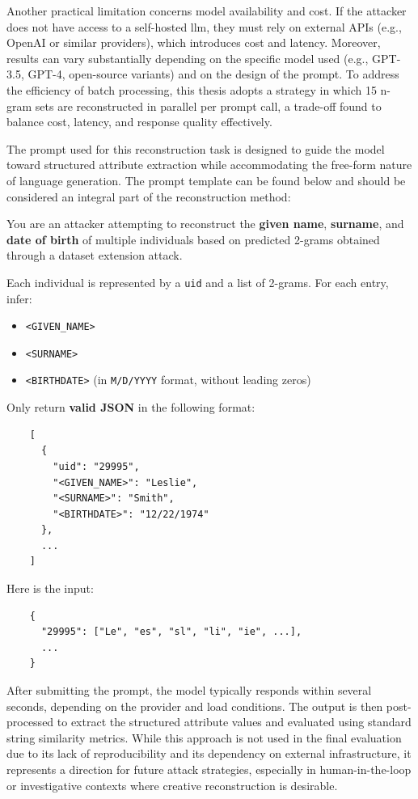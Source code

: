 Another practical limitation concerns model availability and cost.
If the attacker does not have access to a self-hosted \ac{llm}, they must rely on external APIs (e.g., OpenAI or similar providers), which introduces cost and latency.
Moreover, results can vary substantially depending on the specific model used (e.g., GPT-3.5, GPT-4, open-source variants) and on the design of the prompt.
To address the efficiency of batch processing, this thesis adopts a strategy in which 15 n-gram sets are reconstructed in parallel per prompt call, a trade-off found to balance cost, latency, and response quality effectively.

The prompt used for this reconstruction task is designed to guide the model toward structured attribute extraction while accommodating the free-form nature of language generation.
The prompt template can be found below and should be considered an integral part of the reconstruction method:

\begin{tcolorbox}[title=Prompt Template for \ac{llm} Based Reconstruction,colback=gray!5,colframe=black!50!black]
    You are an attacker attempting to reconstruct the \textbf{given name}, \textbf{surname}, and \textbf{date of birth} of multiple individuals based on predicted 2-grams obtained through a dataset extension attack.

    Each individual is represented by a \texttt{uid} and a list of 2-grams. For each entry, infer:
    \begin{itemize}
        \item \texttt{<GIVEN\_NAME>}
        \item \texttt{<SURNAME>}
        \item \texttt{<BIRTHDATE>} (in \texttt{M/D/YYYY} format, without leading zeros)
    \end{itemize}

    Only return \textbf{valid JSON} in the following format:
    \begin{verbatim}
    [
      {
        "uid": "29995",
        "<GIVEN_NAME>": "Leslie",
        "<SURNAME>": "Smith",
        "<BIRTHDATE>": "12/22/1974"
      },
      ...
    ]
    \end{verbatim}

    Here is the input:
    \begin{verbatim}
    {
      "29995": ["Le", "es", "sl", "li", "ie", ...],
      ...
    }
    \end{verbatim}
    \end{tcolorbox}


After submitting the prompt, the model typically responds within several seconds, depending on the provider and load conditions.
The output is then post-processed to extract the structured attribute values and evaluated using standard string similarity metrics.
While this approach is not used in the final evaluation due to its lack of reproducibility and its dependency on external infrastructure, it represents a direction for future attack strategies, especially in human-in-the-loop or investigative contexts where creative reconstruction is desirable.


